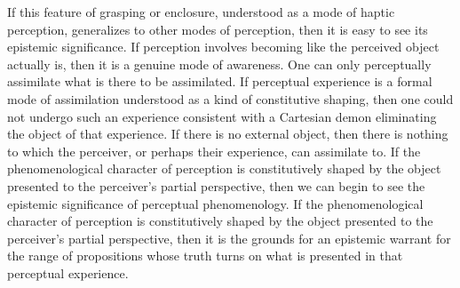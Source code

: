 If this feature of grasping or enclosure, understood as a mode of haptic perception, generalizes to other modes of perception, then it is easy to see its epistemic significance. If perception involves becoming like the perceived object actually is, then it is a genuine mode of awareness. One can only perceptually assimilate what is there to be assimilated. If perceptual experience is a formal mode of assimilation understood as a kind of constitutive shaping, then one could not undergo such an experience consistent with a Cartesian demon eliminating the object of that experience. If there is no external object, then there is nothing to which the perceiver, or perhaps their experience, can assimilate to. If the phenomenological character of perception is constitutively shaped by the object presented to the perceiver's partial perspective, then we can begin to see the epistemic significance of perceptual phenomenology. If the phenomenological character of perception is constitutively shaped by the object presented to the perceiver's partial perspective, then it is the grounds for an epistemic warrant for the range of propositions whose truth turns on what is presented in that perceptual experience.

